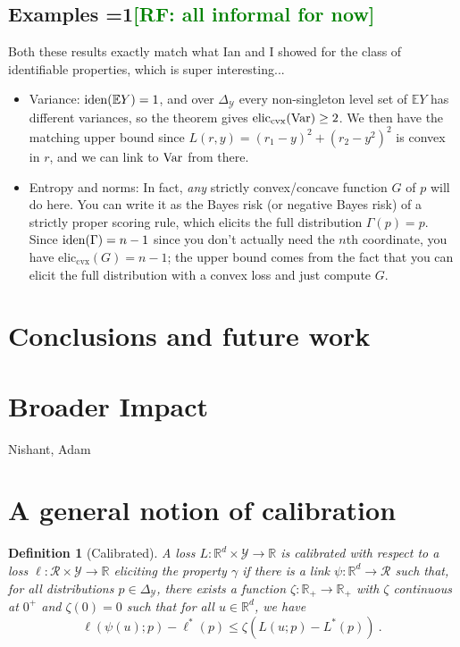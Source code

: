 \documentclass{article}
\newcommand{\Comments}{1}
\newcommand{\mynote}[2]{\ifnum\Comments=1\textcolor{#1}{#2}\fi}
\newcommand{\raf}[1]{\mynote{green}{[RF: #1]}}
\newcommand{\reals}{\mathbb{R}}
\newcommand{\simplex}{\Delta_\Y}
\newcommand{\eliccvx}{\mathrm{elic}_\mathrm{cvx}}
\newcommand{\E}{\mathbb{E}}
\newcommand{\R}{\mathcal{R}}
\newcommand{\Y}{\mathcal{Y}}
\newcommand{\risk}[1]{#1^*}
\newtheorem{definition}{Definition}
\begin{document}
\subsection{Examples \raf{all informal for now}}

Both these results exactly match what Ian and I showed for the class of identifiable properties, which is super interesting...
\begin{itemize}
\item Variance: $\iden(\E Y) = 1$, and over $\simplex$ every non-singleton level set of $\E Y$ has different variances, so the theorem gives $\eliccvx(\Var) \geq 2$.  We then have the matching upper bound since $L(r,y) = (r_1-y)^2 + (r_2-y^2)^2$ is convex in $r$, and we can link to $\mathrm{Var}$ from there.
\item Entropy and norms: In fact, \emph{any} strictly convex/concave function $G$ of $p$ will do here.  You can write it as the Bayes risk (or negative Bayes risk) of a strictly proper scoring rule, which elicits the full distribution $\Gamma(p) = p$.  Since $\mathrm{iden}(\Gamma) = n-1$ since you don't actually need the $n$th coordinate, you have $\eliccvx(G) = n-1$; the upper bound comes from the fact that you can elicit the full distribution with a convex loss and just compute $G$.
\end{itemize}


\section{Conclusions and future work}\label{sec:conclusions}



\newpage

\section*{Broader Impact}

\begin{ack}
Nishant, Adam
\end{ack}




\newpage
\appendix
\section{A general notion of calibration}\label{app:calibration}

\begin{definition}[Calibrated]\label{def:calibrated-general}
	A loss $L:\reals^d \times \Y \to \reals$ is \emph{calibrated} with respect to a loss $\ell : \R \times \Y \to \reals$ eliciting the property $\gamma$ if there is a link $\psi : \reals^d \to \R$ such that, for all distributions $p \in \simplex$, there exists a function $\zeta : \reals_+ \to \reals_+$ with $\zeta$ continuous at $0^+$ and $\zeta(0) = 0$ such that for all $u \in \reals^d$, we have
	\begin{equation}\label{eq:calibrated-general}
	\ell( \psi(u); p) - \risk{\ell}(p)  \leq \zeta \left(  L(u;p) - \risk{L}(p) \right)~.~
	\end{equation}
\end{definition}
\end{document}
